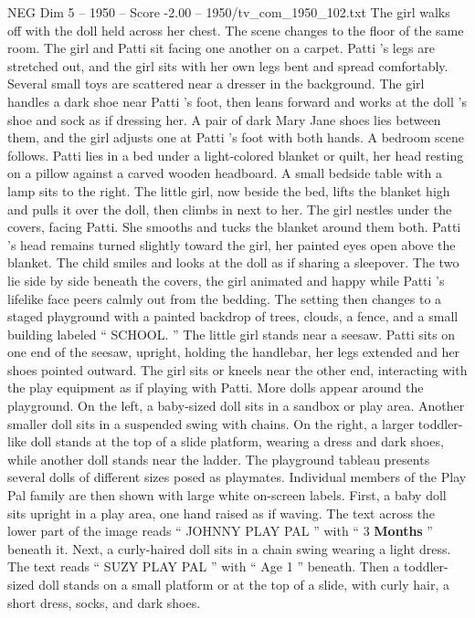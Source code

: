 \begin{textsample}{NEG Dim 5 – 1950 – Score -2.00 – 1950/tv\_com\_1950\_102.txt}
The girl walks off with the doll held across her chest.
The scene changes to the floor of the same room.
The girl and Patti sit facing one another on a carpet.
Patti ’s legs are stretched out, and the girl sits with her own legs bent and spread comfortably.
Several small toys are scattered near a dresser in the background.
The girl handles a dark shoe near Patti ’s foot, then leans forward and works at the doll ’s shoe and sock as if dressing her.
A pair of dark Mary Jane shoes lies between them, and the girl adjusts one at Patti ’s foot with both hands.
A bedroom scene follows.
Patti lies in a bed under a light-colored blanket or quilt, her head resting on a pillow against a carved wooden headboard.
A small bedside table with a lamp sits to the right.
The little girl, now beside the bed, lifts the blanket high and pulls it over the doll, then climbs in next to her.
The girl nestles under the covers, facing Patti.
She smooths and tucks the blanket around them both.
Patti ’s head remains turned slightly toward the girl, her painted eyes open above the blanket.
The child smiles and looks at the doll as if sharing a sleepover.
The two lie side by side beneath the covers, the girl animated and happy while Patti ’s lifelike face peers calmly out from the bedding.
The setting then changes to a staged playground with a painted backdrop of trees, clouds, a fence, and a small building labeled “ SCHOOL. ” The little girl stands near a seesaw.
Patti sits on one end of the seesaw, upright, holding the handlebar, her legs extended and her shoes pointed outward.
The girl sits or kneels near the other end, interacting with the play equipment as if playing with Patti.
More dolls appear around the playground.
On the left, a baby-sized doll sits in a sandbox or play area.
Another smaller doll sits in a suspended swing with chains.
On the right, a larger toddler-like doll stands at the top of a slide platform, wearing a dress and dark shoes, while another doll stands near the ladder.
The playground tableau presents several dolls of different sizes posed as playmates.
Individual members of the Play Pal family are then shown with large white on-screen labels.
First, a baby doll sits upright in a play area, one hand raised as if waving.
The text across the lower part of the image reads “ JOHNNY PLAY PAL ” with “ 3 \textbf{Months} ” beneath it.
Next, a curly-haired doll sits in a chain swing wearing a light dress.
The text reads “ SUZY PLAY PAL ” with “ Age 1 ” beneath.
Then a toddler-sized doll stands on a small platform or at the top of a slide, with curly hair, a short dress, socks, and dark shoes.

\end{textsample}
